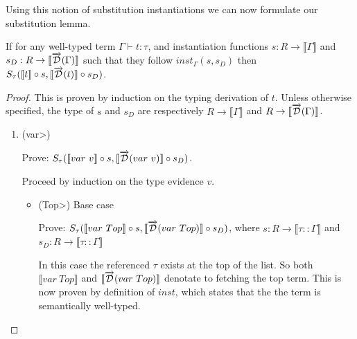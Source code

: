 \documentclass[11pt, final]{article}
\begin{document}
  Using this notion of substitution instantiations we can now formulate our substitution lemma.

  \begin{lemma}[Substitution]\label{thm:substitution_lemma}
    If for any well-typed term $\Gamma \vdash t : \tau$, and instantiation functions $s : R \rightarrow \llbracket \Gamma \rrbracket$ and $s_D : R \rightarrow \llbracket \overrightarrow{\mathcal{D}}(\Gamma) \rrbracket$ such that they follow $inst_\Gamma(s, s_D)$ then $S_\tau(\llbracket t\rrbracket \circ s, \llbracket \overrightarrow{\mathcal{D}}(t)\rrbracket \circ s_D)$.
  \end{lemma}

  \begin{proof}

    This is proven by induction on the typing derivation of $t$.
    Unless otherwise specified, the type of $s$ and $s_D$ are respectively $R \rightarrow \llbracket \Gamma \rrbracket$ and $R \rightarrow \llbracket \overrightarrow{\mathcal{D}}(\Gamma) \rrbracket$.
    \begin{enumerate}
      \item (\<var>)

        Prove: $S_\tau(\llbracket var\ v \rrbracket \circ s, \llbracket \overrightarrow{\mathcal{D}}(var\ v) \rrbracket \circ s_D)$.

        Proceed by induction on the type evidence $v$.
        \begin{itemize}
          \item(\<Top>) Base case

          Prove: $S_\tau(\llbracket var\ Top \rrbracket \circ s, \llbracket \overrightarrow{\mathcal{D}}(var\ Top) \rrbracket \circ s_D)$, where $s : R \rightarrow \llbracket \tau :: \Gamma \rrbracket$ and $s_D : R \rightarrow \llbracket \tau :: \Gamma \rrbracket$

          In this case the referenced $\tau$ exists at the top of the list.
          So both $\llbracket var\ Top \rrbracket$ and $\llbracket \overrightarrow{\mathcal{D}}(var\ Top) \rrbracket$ denotate to fetching the top term.
          This is now proven by definition of $inst$, which states that the the term is semantically well-typed.


\end{itemize}
\end{enumerate}
\end{proof}
\end{document}
